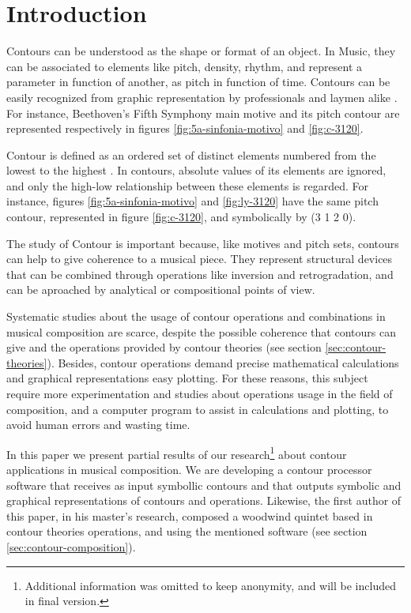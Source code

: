 

\section{Introduction}
\label{sec:introduction}

Contours can be understood as the shape or format of an object. In
Music, they can be associated to elements like pitch, density, rhythm,
and represent a parameter in function of another, as pitch in function
of time. Contours can be easily recognized from graphic representation
by professionals and laymen alike \cite{marvin88:generalized}. For
instance, Beethoven's Fifth Symphony main motive and its pitch contour
are represented respectively in figures \ref{fig:5a-sinfonia-motivo}
and \ref{fig:c-3120}.

Contour is defined as an ordered set of distinct elements numbered
from the lowest to the highest \cite{morris93:directions}. In
contours, absolute values of its elements are ignored, and only the
high-low relationship between these elements is regarded. For
instance, figures \ref{fig:5a-sinfonia-motivo} and \ref{fig:ly-3120}
have the same pitch contour, represented in figure \ref{fig:c-3120},
and symbolically by (3 1 2 0).

The study of Contour is important because, like motives and pitch
sets, contours can help to give coherence to a musical piece. They
represent structural devices that can be combined through operations
like inversion and retrogradation, and can be aproached by analytical
or compositional points of view.

Systematic studies about the usage of contour operations and
combinations in musical composition are scarce, despite the possible
coherence that contours can give and the operations provided by
contour theories (see section \ref{sec:contour-theories}). Besides,
contour operations demand precise mathematical calculations and
graphical representations easy plotting. For these reasons, this
subject require more experimentation and studies about operations
usage in the field of composition, and a computer program to assist in
calculations and plotting, to avoid human errors and wasting time.

In this paper we present partial results of our
research\footnote{Additional information was omitted to keep
  anonymity, and will be included in final version.} about contour
applications in musical composition. We are developing a contour
processor software that receives as input symbollic contours and that
outputs symbolic and graphical representations of contours and
operations. Likewise, the first author of this paper, in his master's
research, composed a woodwind quintet based in contour theories
operations, and using the mentioned software (see section
\ref{sec:contour-composition}).

